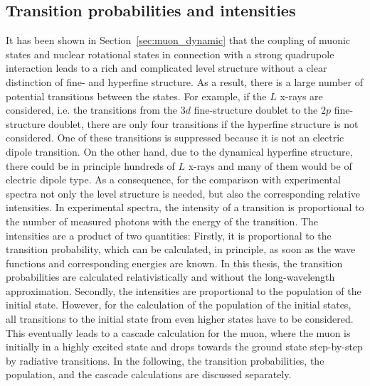 %

\subsection{Transition probabilities and intensities}
\label{sec:transitions}
It has been shown in Section~\ref{sec:muon_dynamic} that the coupling of muonic states and nuclear rotational states in connection with a strong quadrupole interaction leads to a rich and complicated level structure without a clear distinction of fine- and hyperfine structure. As a result, there is a large number of potential transitions between the states. For example, if the $L$ x-rays are considered, i.e. the transitions from the $3d$ fine-structure doublet to the $2p$ fine-structure doublet, there are only four transitions if the hyperfine structure is not considered. One of these transitions is suppressed because it is not an electric dipole transition. On the other hand, due to the dynamical hyperfine structure, there could be in principle hundreds of $L$ x-rays and many of them would be of electric dipole type. As a consequence, for the comparison with experimental spectra not only the level structure is needed, but also the corresponding relative intensities. In experimental spectra, the intensity of a transition is proportional to the number of measured photons with the energy of the transition. The intensities are a product of two quantities:
Firstly, it is proportional to the transition probability, which can be calculated, in principle, as soon as the wave functions and corresponding energies are known. In this thesis, the transition probabilities are calculated relativistically and without the long-wavelength approximation.
Secondly, the intensities are proportional to the population of the initial state. However, for the calculation of the population of the initial states, all transitions to the initial state from even higher states have to be considered. This eventually leads to a cascade calculation for the muon, where the muon is initially in a highly excited state and drops towards the ground state step-by-step by radiative transitions. In the following, the transition probabilities, the population, and the cascade calculations are discussed separately.\\

